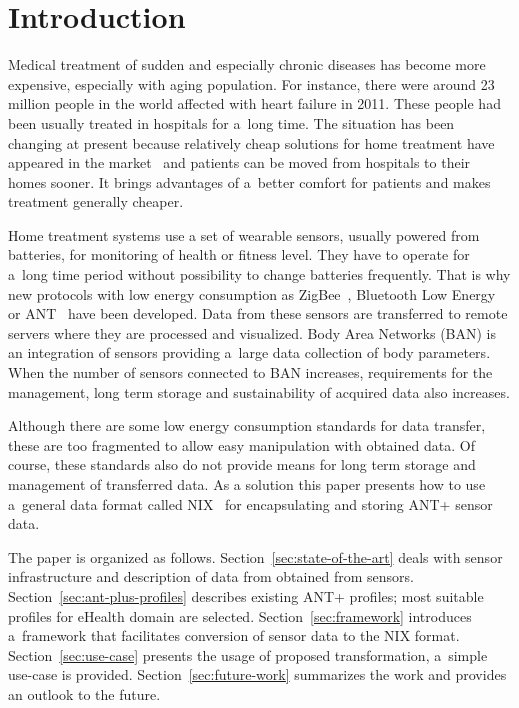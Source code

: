 \documentclass[conference]{IEEEtran}
\begin{document}
\section{Introduction}\label{sec:intro}
Medical treatment of sudden and especially chronic diseases has become more expensive, especially with aging population. For instance, there were around 23 million people in the world affected with heart failure in 2011\cite{bui2011epidemiology}. These people had been usually treated in hospitals for a~long time. The situation has been changing at present because relatively cheap solutions for home treatment have appeared in the market~\cite{4761985, 5333913} and patients can be moved from hospitals to their homes sooner. It brings advantages of a~better comfort for patients and makes treatment generally cheaper.

Home treatment systems use a set of wearable sensors, usually powered from batteries, for monitoring of health or fitness level. They have to operate for a~long time period without possibility to change batteries frequently. That is why new protocols with low energy consumption as ZigBee~\cite{Farahani:2008:ZWN:1457417}, Bluetooth Low Energy~\cite{heydon2012bluetooth} or ANT~\cite{zaloker2014ant} have been developed. Data from these sensors are transferred to remote servers where they are processed and visualized. Body Area Networks (BAN) is an integration of sensors providing a~large data collection of body parameters.  When the number of sensors connected to BAN increases, requirements for the management, long term storage and sustainability of acquired data also increases.

Although there are some low energy consumption standards for data transfer, these are too fragmented to allow easy manipulation with obtained data. Of course, these standards also do not provide means for long term storage and management of transferred data. As a solution this paper presents how to use a~general data format called NIX~\cite{Stoewer:2014} for encapsulating and storing ANT+ sensor data.

The paper is organized as follows. Section~\ref{sec:state-of-the-art} deals with sensor infrastructure and description of data from obtained from sensors. Section~\ref{sec:ant-plus-profiles} describes existing ANT+ profiles; most suitable profiles for eHealth domain are selected. Section~\ref{sec:framework} introduces a~framework that facilitates conversion of sensor data to the NIX format. Section~\ref{sec:use-case} presents the usage of proposed transformation, a~simple use-case is provided. Section~\ref{sec:future-work} summarizes the work and provides an outlook to the future.
\end{document}
